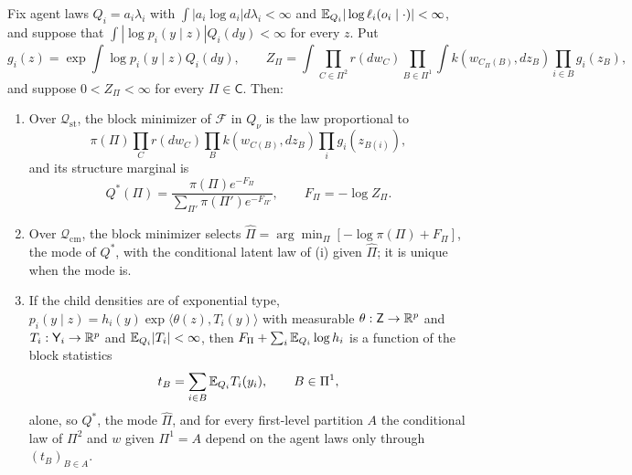 Fix agent laws $Q_i=a_i\lambda_i$ with $\int|a_i\log a_i|d\lambda_i<\infty$
and $\mathbb E_{Q_i}|\log\ell_i(o_i\mid\cdot)|<\infty$, and suppose that
$\int|\log p_i(y\mid z)|Q_i(dy)<\infty$ for every $z$. Put
\begin{equation}
 g_i(z)=\exp\int\log p_i(y\mid z)Q_i(dy),
 \qquad
 Z_\Pi=\int\prod_{C\in\Pi^2}r(dw_C)\prod_{B\in\Pi^1}\int k(w_{C_\Pi(B)},dz_B)
 \prod_{i\in B}g_i(z_B),
 \label{gf:pseudo-evidence}
\end{equation}
and suppose $0<Z_\Pi<\infty$ for every $\Pi\in\mathsf C$. Then:
\begin{enumerate}
\item[(i)] Over $\mathcal Q_{\mathrm{st}}$, the block minimizer of
$\mathcal F$ in $Q_\nu$ is the law proportional to
\begin{equation*}
 \pi(\Pi)\prod_Cr(dw_C)\prod_Bk(w_{C(B)},dz_B)\prod_ig_i(z_{B(i)}),
\end{equation*}
and its structure marginal is
\begin{equation}
 Q^*(\Pi)=\frac{\pi(\Pi)e^{-F_\Pi}}{\sum_{\Pi'}\pi(\Pi')e^{-F_{\Pi'}}},
 \qquad F_\Pi=-\log Z_\Pi.
 \label{gf:structure-posterior}
\end{equation}
\item[(ii)] Over $\mathcal Q_{\mathrm{cm}}$, the block minimizer selects
$\hat\Pi=\arg\min_\Pi[-\log\pi(\Pi)+F_\Pi]$, the mode of $Q^*$, with the
conditional latent law of (i) given $\hat\Pi$; it is unique when the mode is.
\item[(iii)] If the child densities are of exponential type,
$p_i(y\mid z)=h_i(y)\exp\langle\theta(z),T_i(y)\rangle$ with measurable
$\theta:\mathsf Z\to\mathbb R^p$ and $T_i:\mathsf Y_i\to\mathbb R^p$ and $\mathbb E_{Q_i}|T_i|<\infty$,
then $F_\Pi+\sum_i\mathbb E_{Q_i}\log h_i$ is a function of the block statistics
\begin{equation}
 t_B=\sum_{i\in B}\mathbb E_{Q_i}T_i(y_i),\qquad B\in\Pi^1,
 \label{gf:block-statistic}
\end{equation}
alone, so $Q^*$, the mode $\hat\Pi$, and for every first-level partition $A$
the conditional law of $\Pi^2$ and $w$ given $\Pi^1=A$ depend on the agent
laws only through $(t_B)_{B\in A}$.
\end{enumerate}
